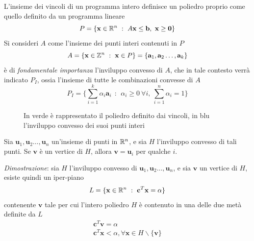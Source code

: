 \documentclass[10pt, letterpaper]{report}
\newcommand{\bb}{{\mathbf{b}}}
\newcommand{\bc}{{\mathbf{c}}}
\newcommand{\x}{{\mathbf{x}}}
\begin{document}
L'insieme dei vincoli di un programma intero definisce un poliedro proprio come quello definito da un programma lineare 
$$ P=\{\x\in\R^n \ : \ A\x\le\bb, \ \x\ge \mathbf 0\}$$
Si consideri $A$ come l'insieme dei punti interi contenuti in $P$
$$ A=\{\x\in\Z^n \ : \ \x\in P\}=\{\mathbf a_1,\mathbf a_2\dots,\mathbf a_k\}$$
è di \textit{fondamentale importanza} l'inviluppo convesso di $A$, che in tale contesto verrà indicato $P_I$, ossia l'insieme di tutte le combinazioni convesse di $A$
$$P_I =
     \Big\{\sum_{i=1}^k \alpha_i\mathbf{a}_i  \ \ : \ \ \alpha_i\ge 0 \ \forall i,\ \sum_{i=1}^n \alpha_i=1\Big\} $$

\begin{figure}[h]
    \caption{In verde è rappresentato il poliedro definito dai vincoli, in blu l'inviluppo convesso dei suoi punti interi}
\end{figure}
\begin{proposizione}
    Sia $\mathbf u_1,\mathbf u_2\dots,\mathbf u_n$ un'insieme di punti in ${\mathbb R}^n$, e sia $H$ l'inviluppo convesso di tali punti. Se $\mathbf v$ è un vertice di $H$, allora $\mathbf v = \mathbf u_i$ per qualche $i$.
\end{proposizione}
\textit{Dimostrazione}: sia $H$ l'inviluppo convesso di $\mathbf u_1,\mathbf u_2\dots,\mathbf u_n$, e sia $\mathbf v$ un vertice di $H$, esiste quindi un iper-piano 
$$L=\{\x\in\R^n \ : \ \bc^T\x=\alpha\} $$contenente $\mathbf v$ tale per cui l'intero poliedro $H$ è contenuto in una delle due metà definite da $L$\begin{eqnarray*}
    \bc^T\mathbf v = \alpha\\ 
    \bc^T\x<\alpha, \forall \x\in H\backslash\{\mathbf v\}
\end{eqnarray*}
\end{document}

